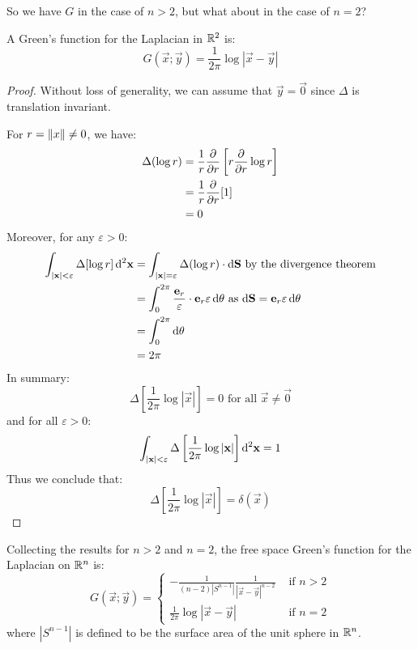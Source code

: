\documentclass[../main.tex]{subfiles}
\begin{document}
So we have $G$ in the case of $n > 2$, but what about in the case of $n = 2$?
\begin{proposition}
  A Green's function for the Laplacian in $\mathbb{R}^2$ is:
  \[
    G(\vec{x}; \vec{y}) = \frac{1}{2\pi} \log|\vec{x} - \vec{y}|
  \]
\end{proposition}
\begin{proof}
  Without loss of generality, we can assume that $\vec{y} = \vec{0}$ since $\Delta$ is translation invariant.

  For $r = \left\lVert x \right\rVert \neq 0$, we have:
  \begin{align*}
    \Delta(\log r) &= \frac{1}{r} \pderiv{}{r}\left[r \pderiv{}{r} \log r\right] \\
                   &= \frac{1}{r} \pderiv{}{r}[1] \\
                   &= 0
  \end{align*}
  Moreover, for any $\varepsilon > 0$:
  \begin{align*}
    \int_{|\vec{x}| < \varepsilon} \Delta[\log r] \d^2{\vec{x}} &= \int_{|\vec{x}| = \varepsilon} \Delta (\log r) \cdot \d{\vec{S}} \text{ by the divergence theorem} \\
                                                                &= \int_{0}^{2\pi} \frac{\vec{e}_r}{\varepsilon} \cdot \vec{e}_r  \varepsilon \d{\theta} \text{ as $\d{\vec{S}} = \vec{e}_r \varepsilon \d{\theta}$} \\
                                                                &= \int_{0}^{2\pi} \d{\theta} \\
                                                                &= 2\pi
  \end{align*}
  In summary:
  \[
    \Delta\left[\frac{1}{2\pi} \log |\vec{x}|\right] = 0 \text{ for all } \vec{x} \neq \vec{0}
  \]
  and for all $\varepsilon > 0$:
  \[
    \int_{|\vec{x}| < \varepsilon} \Delta\left[\frac{1}{2\pi} \log |\vec{x}|\right] \d^2{\vec{x}} = 1
  \]
  Thus we conclude that:
  \[
    \Delta\left[\frac{1}{2\pi} \log |\vec{x}|\right] = \delta(\vec{x})
  \]
\end{proof}
Collecting the results for $n > 2$ and $n = 2$, the free space Green's function for the Laplacian on $\mathbb{R}^{n}$ is:
\[
  G(\vec{x}; \vec{y}) = \begin{cases}
  - \frac{1}{(n - 2)|S^{n - 1}|} \frac{1}{|\vec{x} - \vec{y}|^{n - 2}} & \text{ if } n > 2 \\
  \frac{1}{2\pi} \log|\vec{x} - \vec{y}| & \text{ if } n = 2
  \end{cases}
\]
where $|S^{n - 1}|$ is defined to be the surface area of the unit sphere in $\mathbb{R}^{n}$.
\end{document}
